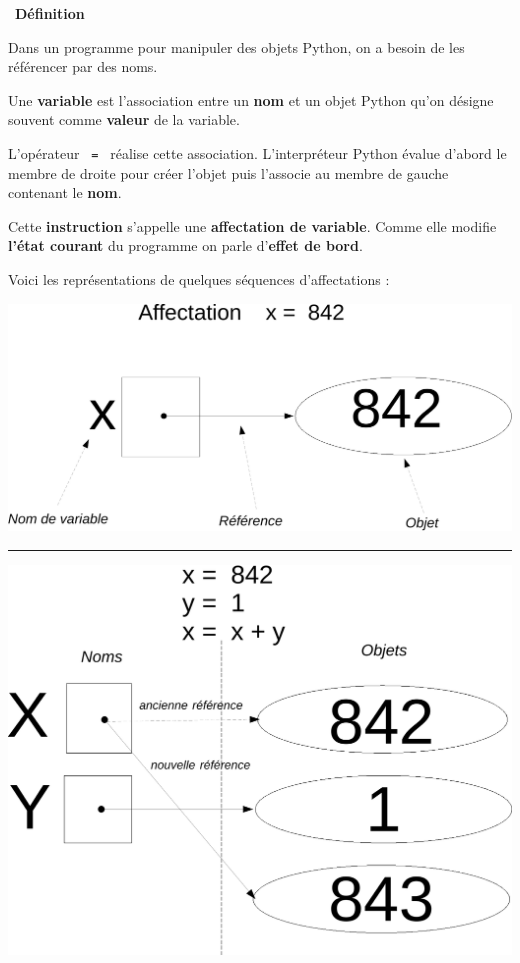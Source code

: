 \documentclass[a4paper, french, 12pt]{article}  %
\newcounter{def}
\newenvironment{definition}[1]
{\par \medskip   \addtocounter{def}{1} \noindent  
\begin{bclogo}[arrondi =0.1,  ombre = true, barre=none, logo=\bcbook, marge=4]{~\textbf{Définition} \textbf{\thedef} {\itshape #1} }  \par}
{
\end{bclogo}
 \par \bigskip }
\newcounter{prog}
\begin{document}
\begin{definition}{}
Dans un programme pour manipuler des objets Python, on a besoin de les référencer par des noms.

Une \textbf{variable} est l'association entre un \textbf{nom} et un objet Python qu'on désigne souvent comme \textbf{valeur} de la variable.

L'opérateur \texttt{ = } réalise cette association. L'interpréteur Python évalue d'abord le membre de droite pour créer l'objet puis l'associe au membre de gauche contenant le \textbf{nom}. 


Cette \textbf{instruction} s'appelle une \textbf{affectation de variable}. Comme elle modifie \textbf{l'état courant} du programme on parle d'\textbf{effet de bord}.



\medskip

Voici les  représentations de  quelques  séquences d'affectations :


\begin{center}
\includegraphics[scale=0.4]{ressources/affectation1-crop.pdf}
\end{center}

\hrule

\begin{center}
\includegraphics[scale=0.4]{ressources/affectation2-crop.pdf}
\end{center}



\end{definition}
\end{document}
